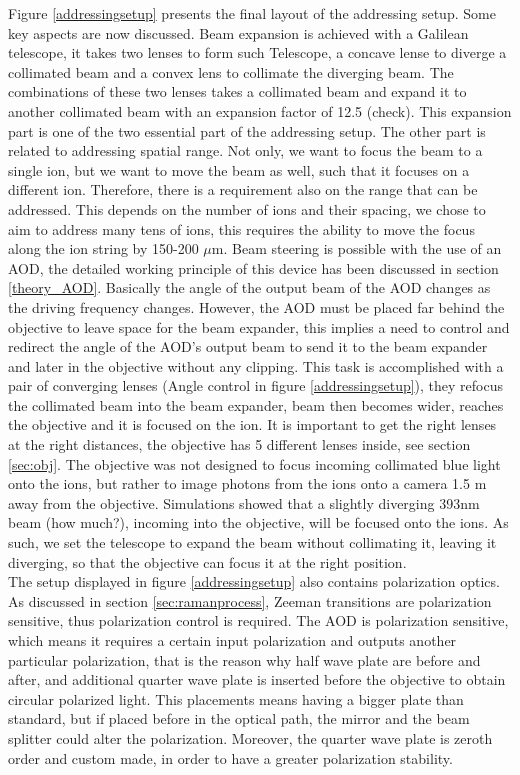 Figure \ref{addressingsetup} presents the final layout of the addressing setup. Some key aspects are now discussed. Beam expansion is achieved with a Galilean telescope, it takes two lenses to form such Telescope, a concave lense to diverge a collimated beam and a convex lens to collimate the diverging beam. The combinations of these two lenses takes a collimated beam and expand it to another collimated beam with an expansion factor of 12.5 (check). This expansion part is one of the two essential part of the addressing setup. The other part is related to addressing spatial range. Not only, we want to focus the beam to a single ion, but we want to move the beam as well, such that it focuses on a different ion. Therefore, there is a requirement also on the range that can be addressed. This depends on the number of ions and their spacing, we chose to aim to address many tens of ions, this requires the ability to move the focus along the ion string by 150-200 $\mu$m. Beam steering is possible with the use of an AOD, the detailed working principle of this device has been discussed in section \ref{theory_AOD}. Basically the angle of the output beam of the AOD changes as the driving frequency changes. However, the AOD must be placed far behind the objective to leave space for the beam expander, this implies a need to control and redirect the angle of the AOD's output beam to send it to the beam expander and later in the objective without any clipping. This task is accomplished with a pair of converging lenses (Angle control in figure \ref{addressingsetup}), they refocus the collimated beam into the beam expander, beam then becomes wider, reaches the objective and it is focused on the ion. It is important to get the right lenses at the right distances, the objective has 5 different lenses inside, see section \ref{sec:obj}. The objective was not designed to focus incoming collimated blue light onto the ions, but rather to image photons from the ions onto a camera 1.5 m away from the objective. Simulations showed that a slightly diverging 393nm beam (how much?), incoming into the objective, will be focused onto the ions. As such, we set the telescope to expand the beam without collimating it, leaving it diverging, so that the objective can focus it at the right position.\\
The setup displayed in figure \ref{addressingsetup} also contains polarization optics. As discussed in section \ref{sec:ramanprocess}, Zeeman transitions are polarization sensitive, thus polarization control is required. The AOD is polarization sensitive, which means it requires a certain input polarization and outputs another particular polarization, that is the reason why half wave plate are before and after, and additional quarter wave plate is inserted before the objective to obtain circular polarized light. This placements means having a bigger plate than standard, but if placed before in the optical path, the mirror and the beam splitter could alter the polarization. Moreover, the quarter wave plate is zeroth order and custom made, in order to have a greater polarization stability.\\
